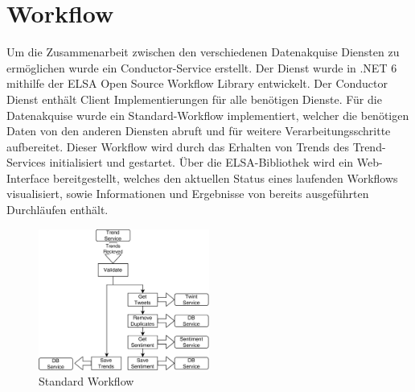 \documentclass[conference]{IEEEtran}
\begin{document}
\section{Workflow}
Um die Zusammenarbeit zwischen den verschiedenen Datenakquise Diensten zu ermöglichen wurde ein Conductor-Service erstellt.
Der Dienst wurde in .NET 6 mithilfe der ELSA \cite{elsa} Open Source Workflow Library entwickelt.
Der Conductor Dienst enthält Client Implementierungen für alle benötigen Dienste.
Für die Datenakquise wurde ein Standard-Workflow implementiert, welcher die benötigen Daten von den anderen Diensten abruft und für weitere Verarbeitungsschritte aufbereitet.
Dieser Workflow wird durch das Erhalten von Trends des Trend-Services initialisiert und gestartet.
Über die ELSA-Bibliothek wird ein Web-Interface bereitgestellt, welches den aktuellen Status eines laufenden Workflows visualisiert, sowie Informationen und Ergebnisse von bereits ausgeführten Durchläufen enthält.

\begin{figure}[h]
    \includegraphics[width=0.5\textwidth]{Workflow.png}
    \caption{Standard Workflow}
\end{figure}
\end{document}
